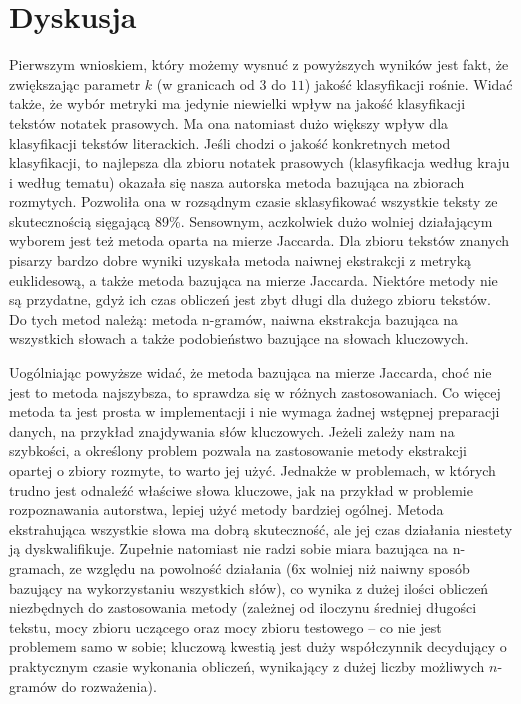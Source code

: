 \documentclass[a4paper]{classrep}
\begin{document}
\section{Dyskusja}
Pierwszym wnioskiem, który możemy wysnuć z powyższych wyników jest fakt, że zwiększając parametr \(k\) (w granicach od \(3\) do \(11\)) jakość klasyfikacji rośnie. Widać także,
że wybór metryki ma jedynie niewielki wpływ na jakość klasyfikacji tekstów notatek prasowych. Ma ona natomiast dużo większy wpływ dla klasyfikacji tekstów literackich.
Jeśli chodzi o jakość konkretnych metod klasyfikacji, to najlepsza dla zbioru notatek prasowych (klasyfikacja według kraju i według tematu)
okazała się nasza autorska metoda bazująca na zbiorach rozmytych. Pozwoliła ona w rozsądnym czasie sklasyfikować wszystkie teksty ze skutecznością sięgającą 89\%. Sensownym, aczkolwiek
dużo wolniej działającym wyborem jest też metoda oparta na mierze Jaccarda.
Dla zbioru tekstów znanych pisarzy bardzo dobre wyniki uzyskała metoda naiwnej ekstrakcji z metryką euklidesową,
a także metoda bazująca na mierze Jaccarda. Niektóre metody nie są przydatne, gdyż ich czas obliczeń jest zbyt długi dla dużego zbioru tekstów. Do tych metod należą:
metoda n-gramów, naiwna ekstrakcja bazująca na wszystkich słowach a także podobieństwo bazujące na słowach kluczowych.

Uogólniając powyższe widać, że metoda bazująca na mierze Jaccarda, choć nie jest to metoda najszybsza, to sprawdza się w różnych zastosowaniach. Co więcej metoda ta jest
prosta w implementacji i nie wymaga żadnej wstępnej preparacji danych, na przykład znajdywania słów kluczowych. Jeżeli zależy nam na szybkości, a określony problem pozwala
na zastosowanie metody ekstrakcji opartej o zbiory rozmyte, to warto jej użyć. Jednakże w problemach, w których trudno jest odnaleźć właściwe słowa kluczowe, jak na przykład
w problemie rozpoznawania autorstwa, lepiej użyć metody bardziej ogólnej. Metoda ekstrahująca wszystkie słowa ma dobrą skuteczność, ale jej czas działania  niestety ją dyskwalifikuje.
Zupełnie natomiast nie radzi sobie miara bazująca na n-gramach, ze względu na powolność działania (\(6\)x wolniej niż naiwny sposób bazujący na wykorzystaniu wszystkich słów), co wynika z dużej ilości obliczeń niezbędnych do zastosowania metody (zależnej od iloczynu średniej długości tekstu, mocy zbioru uczącego oraz mocy zbioru testowego -- co nie jest problemem samo w sobie; kluczową kwestią jest duży współczynnik decydujący o praktycznym czasie wykonania obliczeń, wynikający z dużej liczby możliwych $n$-gramów do rozważenia). 
\end{document}
